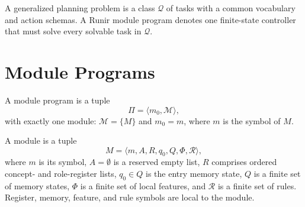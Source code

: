 \documentclass[11pt]{article}
\begin{document}
A generalized planning problem is a class $\mathcal Q$ of tasks with a common
vocabulary and action schemas. A Runir module program denotes one finite-state
controller that must solve every solvable task in $\mathcal Q$.

\section{Module Programs}

A module program is a tuple
\[
  \Pi=\langle m_0,\mathcal M\rangle,
\]
with exactly one module: $\mathcal M=\{M\}$ and $m_0=m$, where $m$ is the
symbol of $M$.

A module is a tuple
\[
  M=\langle m,A,R,q_0,Q,\Phi,\mathcal R\rangle,
\]
where $m$ is its symbol, $A=\emptyset$ is a reserved empty list, $R$ comprises
ordered concept- and role-register lists, $q_0\in Q$ is the entry memory state,
$Q$ is a finite set of memory states, $\Phi$ is a finite set of local features,
and $\mathcal R$ is a finite set of rules. Register, memory, feature, and rule
symbols are local to the module.
\end{document}
